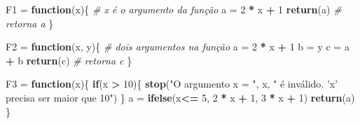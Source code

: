 \documentclass[]{book}
\newenvironment{Shaded}{\begin{snugshade}}{\end{snugshade}}
\newcommand{\CommentTok}[1]{\textcolor[rgb]{0.56,0.35,0.01}{\textit{#1}}}
\newcommand{\ControlFlowTok}[1]{\textcolor[rgb]{0.13,0.29,0.53}{\textbf{#1}}}
\newcommand{\DecValTok}[1]{\textcolor[rgb]{0.00,0.00,0.81}{#1}}
\newcommand{\KeywordTok}[1]{\textcolor[rgb]{0.13,0.29,0.53}{\textbf{#1}}}
\newcommand{\NormalTok}[1]{#1}
\newcommand{\OperatorTok}[1]{\textcolor[rgb]{0.81,0.36,0.00}{\textbf{#1}}}
\newcommand{\StringTok}[1]{\textcolor[rgb]{0.31,0.60,0.02}{#1}}
\begin{document}
\begin{Shaded}
\begin{Highlighting}[]
\NormalTok{F1 =}\StringTok{ }\ControlFlowTok{function}\NormalTok{(x)\{ }\CommentTok{# x é o argumento da função}
\NormalTok{  a =}\StringTok{ }\DecValTok{2} \OperatorTok{*}\StringTok{ }\NormalTok{x }\OperatorTok{+}\StringTok{ }\DecValTok{1}
  \KeywordTok{return}\NormalTok{(a) }\CommentTok{# retorna a}
\NormalTok{\}}

\NormalTok{F2 =}\StringTok{ }\ControlFlowTok{function}\NormalTok{(x, y)\{ }\CommentTok{# dois argumentos na função}
\NormalTok{  a =}\StringTok{ }\DecValTok{2} \OperatorTok{*}\StringTok{ }\NormalTok{x }\OperatorTok{+}\StringTok{ }\DecValTok{1}
\NormalTok{  b =}\StringTok{ }\NormalTok{y}
\NormalTok{  c =}\StringTok{ }\NormalTok{a }\OperatorTok{+}\StringTok{ }\NormalTok{b}
  \KeywordTok{return}\NormalTok{(c) }\CommentTok{# retorna c}
\NormalTok{\}}

\NormalTok{F3 =}\StringTok{ }\ControlFlowTok{function}\NormalTok{(x)\{}
  \ControlFlowTok{if}\NormalTok{(x }\OperatorTok{>}\StringTok{ }\DecValTok{10}\NormalTok{)\{}
    \KeywordTok{stop}\NormalTok{(}\StringTok{"O argumento x = "}\NormalTok{, x, }\StringTok{" é inválido. 'x' precisa ser maior que 10"}\NormalTok{)}
\NormalTok{  \}}
\NormalTok{  a =}\StringTok{ }\KeywordTok{ifelse}\NormalTok{(x}\OperatorTok{<=}\StringTok{ }\DecValTok{5}\NormalTok{, }\DecValTok{2} \OperatorTok{*}\StringTok{ }\NormalTok{x }\OperatorTok{+}\StringTok{ }\DecValTok{1}\NormalTok{, }\DecValTok{3} \OperatorTok{*}\StringTok{ }\NormalTok{x }\OperatorTok{+}\StringTok{ }\DecValTok{1}\NormalTok{)}
  \KeywordTok{return}\NormalTok{(a)}
\NormalTok{\}}


\end{Highlighting}
\end{Shaded}
\end{document}
